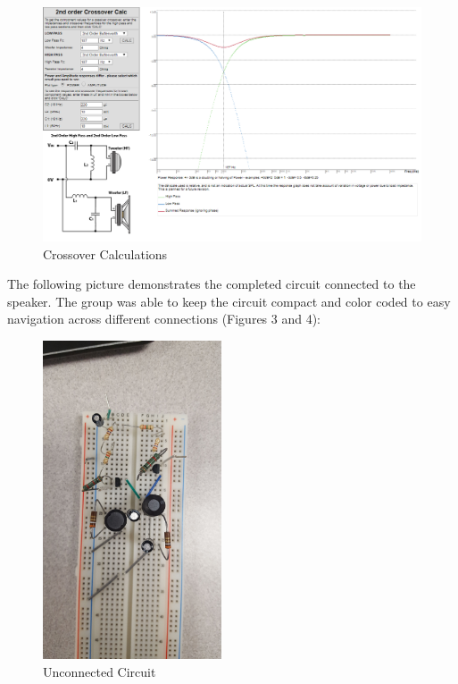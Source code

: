 \documentclass{article}
\begin{document}
\begin{figure}[h]
\begin{center}
\includegraphics[width=\textwidth]{Crossover_Math.png}
\caption{Crossover Calculations}
\end{center}
\end{figure}


The following picture demonstrates the completed circuit connected to the speaker. The group was able to keep the circuit compact and color coded to easy navigation across different connections (Figures 3 and 4):
\newpage

\begin{figure}[h]
\begin{center}
\includegraphics[width=200px]{DisconnectedCircuit-min.jpg}
\caption{Unconnected Circuit}
\end{center}
\end{figure}
\end{document}
